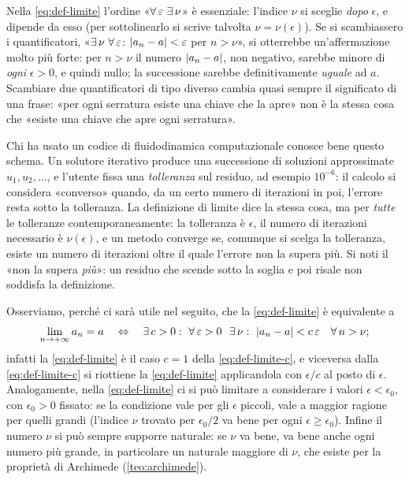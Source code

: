 \begin{attenzione}
Nella \eqref{eq:def-limite} l'ordine «$\forall\,\varepsilon\ \exists\,\nu$» è essenziale:
l'indice $\nu$ si sceglie \emph{dopo} $\epsilon$, e dipende da esso (per sottolinearlo si
scrive talvolta $\nu=\nu(\epsilon)$). Se si scambiassero i quantificatori,
«$\exists\,\nu\ \forall\,\varepsilon$: $\lvert a_{n}-a\rvert<\varepsilon$ per $n>\nu$», si otterrebbe
un'affermazione molto più forte: per $n>\nu$ il numero $\lvert a_{n}-a\rvert$, non negativo,
sarebbe minore di \emph{ogni} $\epsilon>0$, e quindi nullo; la successione sarebbe
definitivamente \emph{uguale} ad $a$. Scambiare due quantificatori di tipo diverso
cambia quasi sempre il significato di una frase: «per ogni serratura esiste una chiave
che la apre» non è la stessa cosa che «esiste una chiave che apre ogni serratura».
\end{attenzione}

\begin{idea}
Chi ha usato un codice di fluidodinamica computazionale conosce bene questo schema. Un
solutore iterativo produce una successione di soluzioni approssimate $u_{1},u_{2},\dots$,
e l'utente fissa una \emph{tolleranza} sul residuo, ad esempio $10^{-6}$: il calcolo si
considera «converso» quando, da un certo numero di iterazioni in poi, l'errore resta sotto
la tolleranza. La definizione di limite dice la stessa cosa, ma per \emph{tutte} le
tolleranze contemporaneamente: la tolleranza è $\epsilon$, il numero di iterazioni
necessario è $\nu(\epsilon)$, e un metodo converge se, comunque si scelga la tolleranza,
esiste un numero di iterazioni oltre il quale l'errore non la supera più. Si noti il
«non la supera \emph{più}»: un residuo che scende sotto la soglia e poi risale non
soddisfa la definizione.
\end{idea}

Osserviamo, perché ci sarà utile nel seguito, che la \eqref{eq:def-limite} è equivalente
a
\begin{equation}\label{eq:def-limite-c}
  \lim_{n\to+\infty}a_{n}=a \quad\sse\quad \esiste c>0 :\ \perogni\epsilon>0\ \ \esiste\nu :\
  \abs{a_{n}-a}<c\,\epsilon\quad\perogni n>\nu ;
\end{equation}
infatti la \eqref{eq:def-limite} è il caso $c=1$ della \eqref{eq:def-limite-c}, e
viceversa dalla \eqref{eq:def-limite-c} si riottiene la \eqref{eq:def-limite} applicandola
con $\epsilon/c$ al posto di $\epsilon$. Analogamente, nella \eqref{eq:def-limite} ci si può
limitare a considerare i valori $\epsilon<\epsilon_{0}$, con $\epsilon_{0}>0$ fissato: se
la condizione vale per gli $\epsilon$ piccoli, vale a maggior ragione per quelli grandi
(l'indice $\nu$ trovato per $\epsilon_{0}/2$ va bene per ogni $\epsilon\ge\epsilon_{0}$).
Infine il numero $\nu$ si può sempre supporre naturale: se $\nu$ va bene, va bene anche
ogni numero più grande, in particolare un naturale maggiore di $\nu$, che esiste per la
proprietà di Archimede (\cref{teo:archimede}).

